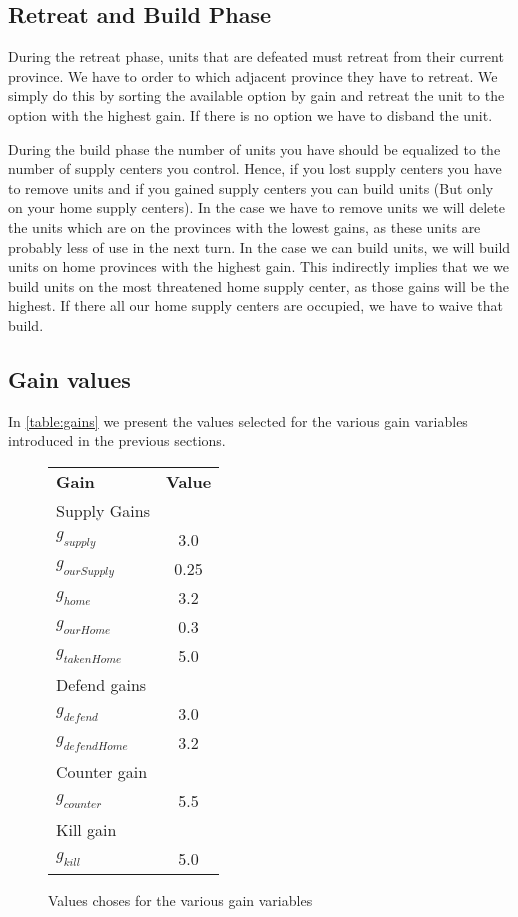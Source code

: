 \documentclass[a4paper]{article} %
\begin{document}
\subsection{Retreat and Build Phase}

During the retreat phase, units that are defeated must retreat from their current province. We have to order to which adjacent province they have to retreat. We simply do this by sorting the available option by gain and retreat the unit to the option with the highest gain. If there is no option we have to disband the unit. 

During the build phase the number of units you have should be equalized to the number of supply centers you control. Hence, if you lost supply centers you have to remove units and if you gained supply centers you can build units (But only on your home supply centers). In the case we have to remove units we will delete the units which are on the provinces with the lowest gains, as these units are probably less of use in the next turn. In the case we can build units, we will build units on home provinces with the highest gain. This indirectly implies that we we build units on the most threatened home supply center, as those gains will be the highest. If there all our home supply centers are occupied, we have to waive that build.    

\subsection{Gain values}

In \autoref{table:gains} we present the values selected for the various gain variables introduced in the previous sections. 

\begin{figure}[H]
\centering
\begin{tabular}{| l | c |}
  \hline            
  {\bf Gain} & {\bf Value}\\
  {Supply Gains} &  \\
  $g_{supply}$ & 3.0 \\
  $g_{ourSupply}$ & 0.25 \\
  $g_{home}$ & 3.2 \\
  $g_{ourHome}$ & 0.3 \\
  $g_{takenHome}$ & 5.0 \\
  {Defend gains} &  \\
  $g_{defend}$ &  3.0 \\
  $g_{defendHome}$ & 3.2 \\
  {Counter gain} & \\
  $g_{counter}$ & 5.5 \\
  {Kill gain} & \\
  $g_{kill}$ & 5.0 \\
  \hline  
\end{tabular}
\caption{Values choses for the various gain variables}
\label{table:gains}
\end{figure}
\end{document}
